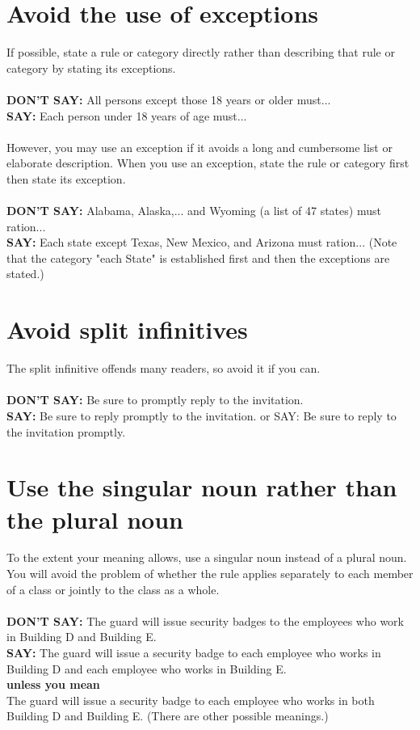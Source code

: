 \documentclass[12pt, letterpaper]{report}
\begin{document}
\begin{linenumbers}
    \section{Avoid the use of exceptions}
     If possible, state a rule or category directly rather than describing that rule or category by stating its exceptions.\\\\
     \textbf{DON'T SAY: }All persons except those 18 years or older must...\\
     \textbf{SAY: }Each person under 18 years of age must...\\\\
    However, you may use an exception if it avoids a long and cumbersome list or elaborate description. When you use an exception, state the rule or category first then state its exception.\\\\
    \textbf{DON'T SAY: }Alabama, Alaska,... and Wyoming (a list of 47 states) must ration...\\
    \textbf{SAY: }Each state except Texas, New Mexico, and Arizona must ration... (Note that the category "each State" is established first and then the exceptions are stated.)
    \section{Avoid split infinitives}
    The split infinitive offends many readers, so avoid it if you can.\\\\
    \textbf{DON'T SAY:} Be sure to promptly reply to the invitation.\\
    \textbf{SAY:} Be sure to reply promptly to the invitation. or SAY: Be sure to reply to the invitation promptly. 
    \section{Use the singular noun rather than the plural noun} 
    To the extent your meaning allows, use a singular noun instead of a plural noun. You will avoid the problem of whether the rule applies separately to each member of a class or jointly to the class as a whole.\\\\
    \textbf{DON'T SAY: }The guard will issue security badges to the employees who work in Building D and Building E.\\
    \textbf{SAY: }The guard will issue a security badge to each employee who works in Building D and each employee who works in Building E.\\
    \textbf{unless you mean}\\
    The guard will issue a security badge to each employee who works in both Building D and Building E. (There are other possible meanings.)

\end{linenumbers}
\end{document}
